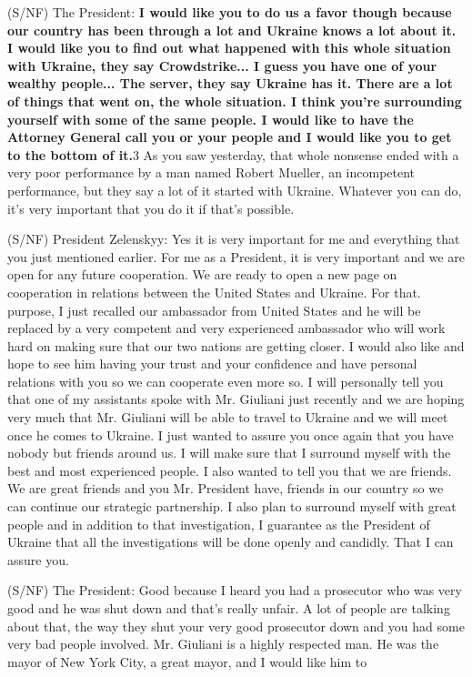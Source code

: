 (S/NF) The President: \textbf{I would like you to do us a favor though
because our country has been through a lot and Ukraine knows a lot about
it. I would like you to find out what happened with this whole situation
with Ukraine, they say Crowdstrike... I guess you have one of your
wealthy people... The server, they say Ukraine has it. There are a lot
of things that went on, the whole situation. I think you're surrounding
yourself with some of the same people. I would like to have the Attorney
General call you or your people and I would like you to get to the
bottom of it.}3 As you saw yesterday, that whole nonsense ended with a
very poor performance by a man named Robert Mueller, an incompetent
performance, but they say a lot of it started with Ukraine. Whatever you
can do, it's very important that you do it if that's possible.

(S/NF) President Zelenskyy: Yes it is very important for me and
everything that you just mentioned earlier. For me as a President, it is
very important and we are open for any future cooperation. We are ready
to open a new page on cooperation in relations between the United States
and Ukraine. For that. purpose, I just recalled our ambassador from
United States and he will be replaced by a very competent and very
experienced ambassador who will work hard on making sure that our two
nations are getting closer. I would also like and hope to see him having
your trust and your confidence and have personal relations with you so
we can cooperate even more so. I will personally tell you that one of my
assistants spoke with Mr. Giuliani just recently and we are hoping very
much that Mr. Giuliani will be able to travel to Ukraine and we will
meet once he comes to Ukraine. I just wanted to assure you once again
that you have nobody but friends around us. I will make sure that I
surround myself with the best and most experienced people. I also wanted
to tell you that we are friends. We are great friends and you Mr.
President have, friends in our country so we can continue our strategic
partnership. I also plan to surround myself with great people and in
addition to that investigation, I guarantee as the President of Ukraine
that all the investigations will be done openly and candidly. That I can
assure you.

(S/NF) The President: Good because I heard you had a prosecutor who was
very good and he was shut down and that's really unfair. A lot of people
are talking about that, the way they shut your very good prosecutor down
and you had some very bad people involved. Mr. Giuliani is a highly
respected man. He was the mayor of New York City, a great mayor, and I
would like him to

